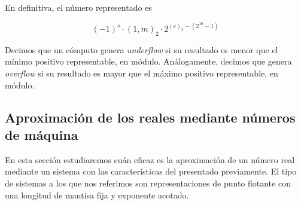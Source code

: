 En definitiva, el número representado es 

\[(-1)^s \cdot (1, m)_2 \cdot 2^{(e)_2 - (2^{10} - 1)}\]

%
%
%
%
%

\begin{defi}
Decimos que un cómputo genera \emph{underflow} si su resultado es menor que el mínimo positivo representable, en módulo. Análogamente, decimos que genera \emph{overflow} si su resultado es mayor que el máximo positivo representable, en módulo.
\end{defi}

\subsection{Aproximación de los reales mediante números de máquina}

En esta sección estudiaremos cuán eficaz es la aproximación de un número real mediante un sistema con las características del presentado previamente. El tipo de sistemas a los que nos referimos son representaciones de punto flotante con una longitud de mantisa fija y exponente acotado.

